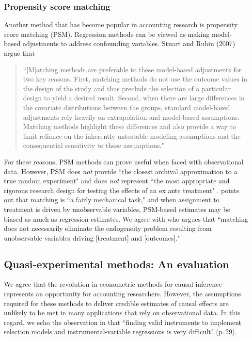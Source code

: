 \documentclass[12pt,reqno,titlepage]{amsart}
\theoremstyle{definition}
\begin{document}
\begin{doublespace}
\subsubsection{Propensity score matching}
Another method that has become popular in accounting research is propensity score matching (PSM).
Regression methods can be viewed as making model-based adjustments to address confounding variables.  
Stuart and Rubin (2007) argue that 

\begin{quote}\begin{singlespace} 
``[M]atching methods are preferable to these model-based adjustments for two key reasons. 
First, matching methods do not use the outcome values in the design of the study and thus preclude the selection of a particular design to yield a desired result.
Second, when there are large differences in the covariate distributions between the groups, standard model-based adjustments rely heavily on extrapolation and model-based assumptions.
Matching methods highlight these differences and also provide a way to limit reliance on the inherently untestable modeling assumptions and the consequential sensitivity to those assumptions."\end{singlespace} 
\end{quote}
For these reasons, PSM methods can prove useful when faced with observational data.
However, PSM does \emph{not} provide ``the closest archival approximation to a true random experiment" and does \emph{not} represent ``the most appropriate and rigorous research design for testing the effects of an ex ante treatment" \citep[p.\,1429]{Kirk:2014gx}.
\citet[pp.\,73-75]{Rosenbaum:2009ul} points out that matching is ``a fairly mechanical  task," and when assignment to treatment is driven by unobservable variables, PSM-based estimates may be biased as much as regression estimates.
We agree with \citet{MinuttiMeza:2014fn} who argues that ``matching does not necessarily eliminate the endogeneity problem resulting from unobservable variables driving [treatment] and [outcomes]."

\subsection{Quasi-experimental methods: An evaluation}
We agree that the revolution in econometric methods for causal inference represents an opportunity for accounting researchers.
However, the assumptions required for these methods to deliver credible estimates of causal effects are unlikely to be met in many applications that rely on observational data. 
In this regard, we echo the observation in \citet{Leuz:2015aa} that ``finding valid instruments to implement selection models and instrumental-variable regressions is very difficult" (p.\,29). 


\end{doublespace}
\end{document}

